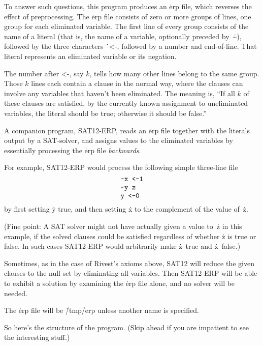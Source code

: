 To answer such questions, this program produces an \.{erp}
file, which reverses the effect of preprocessing. The \.{erp} file
consists of zero or more groups of lines, one group for each
eliminated variable. The first line of every group consists of
the name of a literal (that is, the name of a variable, optionally preceded
by~\.{\~}), followed by the three characters \.{\ <-}, followed by a
number and end-of-line. That literal represents an eliminated variable
or its negation.

The number after \.{<-}, say $k$, tells how many other lines belong to the
same group. Those $k$ lines each contain a clause in the normal way,
where the clauses can involve any variables that haven't been eliminated.
The meaning is, ``If all $k$ of these clauses are satisfied, by the
currently known assignment to uneliminated variables, the
literal should be true; otherwise it should be false.''

A companion program, {\mc SAT12-ERP}, reads an \.{erp} file together
with the literals output by a {\mc SAT}-solver, and assigns values to
the eliminated variables by essentially processing the \.{erp} file
{\it backwards}.

For example, {\mc SAT12-ERP} would process the following simple
three-line file
$$\chardef~=`\~
\vcenter{\halign{\tt#\hfil\cr
~x <-1\cr
~y z\cr
y <-0\cr
}}$$
by first setting \.y true, and then setting \.x to the complement
of the value of~\.z.

(Fine point: A {\mc SAT} solver might not have actually given a value
to~\.z in this example, if the solved clauses could be satisfied
regardless of whether \.z is true or false. In such cases
{\mc SAT12-ERP} would arbitrarily make \.z~true and \.x~false.)

Sometimes, as in the case of Rivest's axioms above, {\mc SAT12} will
reduce the given clauses to the null set by eliminating all variables.
Then {\mc SAT12-ERP} will be able to exhibit a solution by examining
the \.{erp} file alone, and no solver will be needed.

The \.{erp} file will be \.{/tmp/erp} unless another name is specified.

\fi

So here's the structure of the program. (Skip ahead if you are
impatient to see the interesting stuff.)

